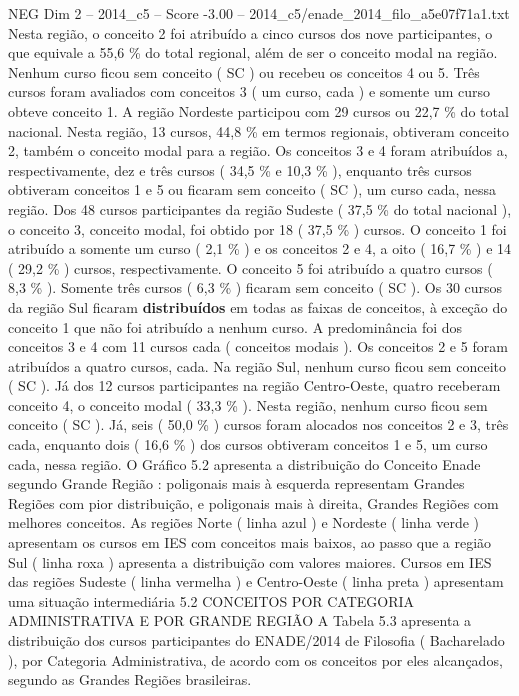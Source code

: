 \begin{textsample}{NEG Dim 2 – 2014\_c5 – Score -3.00 – 2014\_c5/enade\_2014\_filo\_a5e07f71a1.txt}
Nesta região, o conceito 2 foi atribuído a cinco cursos dos nove participantes, o que equivale a 55,6 \% do total regional, além de ser o conceito modal na região.
Nenhum curso ficou sem conceito ( SC ) ou recebeu os conceitos 4 ou 5.
Três cursos foram avaliados com conceitos 3 ( um curso, cada ) e somente um curso obteve conceito 1.
A região Nordeste participou com 29 cursos ou 22,7 \% do total nacional.
Nesta região, 13 cursos, 44,8 \% em termos regionais, obtiveram conceito 2, também o conceito modal para a região.
Os conceitos 3 e 4 foram atribuídos a, respectivamente, dez e três cursos ( 34,5 \% e 10,3 \% ), enquanto três cursos obtiveram conceitos 1 e 5 ou ficaram sem conceito ( SC ), um curso cada, nessa região.
Dos 48 cursos participantes da região Sudeste ( 37,5 \% do total nacional ), o conceito 3, conceito modal, foi obtido por 18 ( 37,5 \% ) cursos.
O conceito 1 foi atribuído a somente um curso ( 2,1 \% ) e os conceitos 2 e 4, a oito ( 16,7 \% ) e 14 ( 29,2 \% ) cursos, respectivamente.
O conceito 5 foi atribuído a quatro cursos ( 8,3 \% ).
Somente três cursos ( 6,3 \% ) ficaram sem conceito ( SC ).
Os 30 cursos da região Sul ficaram \textbf{distribuídos} em todas as faixas de conceitos, à exceção do conceito 1 que não foi atribuído a nenhum curso.
A predominância foi dos conceitos 3 e 4 com 11 cursos cada ( conceitos modais ).
Os conceitos 2 e 5 foram atribuídos a quatro cursos, cada.
Na região Sul, nenhum curso ficou sem conceito ( SC ).
Já dos 12 cursos participantes na região Centro-Oeste, quatro receberam conceito 4, o conceito modal ( 33,3 \% ).
Nesta região, nenhum curso ficou sem conceito ( SC ).
Já, seis ( 50,0 \% ) cursos foram alocados nos conceitos 2 e 3, três cada, enquanto dois ( 16,6 \% ) dos cursos obtiveram conceitos 1 e 5, um curso cada, nessa região.
O Gráfico 5.2 apresenta a distribuição do Conceito Enade segundo Grande Região : poligonais mais à esquerda representam Grandes Regiões com pior distribuição, e poligonais mais à direita, Grandes Regiões com melhores conceitos.
As regiões Norte ( linha azul ) e Nordeste ( linha verde ) apresentam os cursos em IES com conceitos mais baixos, ao passo que a região Sul ( linha roxa ) apresenta a distribuição com valores maiores.
Cursos em IES das regiões Sudeste ( linha vermelha ) e Centro-Oeste ( linha preta ) apresentam uma situação intermediária 5.2 CONCEITOS POR CATEGORIA ADMINISTRATIVA E POR GRANDE REGIÃO A Tabela 5.3 apresenta a distribuição dos cursos participantes do ENADE/2014 de Filosofia ( Bacharelado ), por Categoria Administrativa, de acordo com os conceitos por eles alcançados, segundo as Grandes Regiões brasileiras.

\end{textsample}
